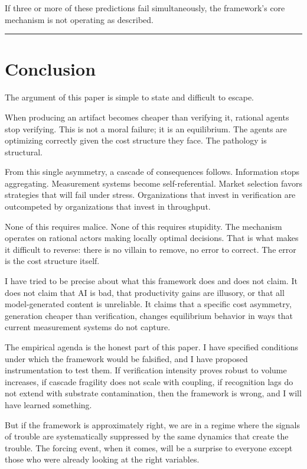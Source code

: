 \documentclass[11pt,a4paper]{article}
\begin{document}
If three or more of these predictions fail simultaneously, the framework's core mechanism is not operating as described.

\begin{center}\rule{0.5\linewidth}{0.5pt}\end{center}

\hypertarget{conclusion}{%
\section{Conclusion}\label{conclusion}}

The argument of this paper is simple to state and difficult to escape.

When producing an artifact becomes cheaper than verifying it, rational agents stop verifying. This is not a moral failure; it is an equilibrium. The agents are optimizing correctly given the cost structure they face. The pathology is structural.

From this single asymmetry, a cascade of consequences follows. Information stops aggregating. Measurement systems become self-referential. Market selection favors strategies that will fail under stress. Organizations that invest in verification are outcompeted by organizations that invest in throughput.

None of this requires malice. None of this requires stupidity. The mechanism operates on rational actors making locally optimal decisions. That is what makes it difficult to reverse: there is no villain to remove, no error to correct. The error is the cost structure itself.

I have tried to be precise about what this framework does and does not claim. It does not claim that AI is bad, that productivity gains are illusory, or that all model-generated content is unreliable. It claims that a specific cost asymmetry, generation cheaper than verification, changes equilibrium behavior in ways that current measurement systems do not capture.

The empirical agenda is the honest part of this paper. I have specified conditions under which the framework would be falsified, and I have proposed instrumentation to test them. If verification intensity proves robust to volume increases, if cascade fragility does not scale with coupling, if recognition lags do not extend with substrate contamination, then the framework is wrong, and I will have learned something.

But if the framework is approximately right, we are in a regime where the signals of trouble are systematically suppressed by the same dynamics that create the trouble. The forcing event, when it comes, will be a surprise to everyone except those who were already looking at the right variables.
\end{document}
